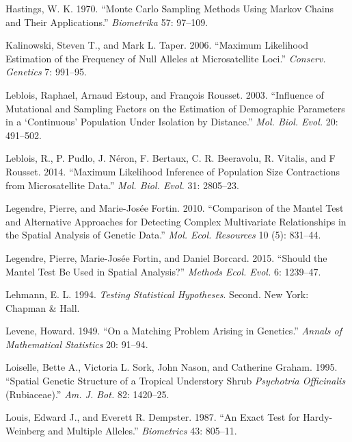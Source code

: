 \documentclass[
  12pt,
]{book}
\newlength{\cslhangindent}
\newlength{\cslentryspacingunit} %
\newenvironment{CSLReferences}[2] %
 {%
  \setlength{\parindent}{0pt}
  \ifodd #1
  \let\oldpar\par
  \def\par{\hangindent=\cslhangindent\oldpar}
  \fi
  \setlength{\parskip}{#2\cslentryspacingunit}
 }%
 {}
\begin{document}
\begin{CSLReferences}{1}{0}
\leavevmode{}%
Hastings, W. K. 1970. {``Monte {C}arlo Sampling Methods Using {M}arkov Chains and Their Applications.''} \emph{Biometrika} 57: 97--109.

\leavevmode{}%
Kalinowski, Steven T., and Mark L. Taper. 2006. {``Maximum Likelihood Estimation of the Frequency of Null Alleles at Microsatellite Loci.''} \emph{Conserv. Genetics} 7: 991--95.

\leavevmode{}%
Leblois, Raphael, Arnaud Estoup, and François Rousset. 2003. {``Influence of Mutational and Sampling Factors on the Estimation of Demographic Parameters in a {`Continuous'} Population Under Isolation by Distance.''} \emph{Mol. Biol. Evol.} 20: 491--502.

\leavevmode{}%
Leblois, R., P. Pudlo, J. Néron, F. Bertaux, C. R. Beeravolu, R. Vitalis, and F Rousset. 2014. {``Maximum Likelihood Inference of Population Size Contractions from Microsatellite Data.''} \emph{Mol. Biol. Evol.} 31: 2805--23.

\leavevmode{}%
Legendre, Pierre, and Marie-Josée Fortin. 2010. {``Comparison of the Mantel Test and Alternative Approaches for Detecting Complex Multivariate Relationships in the Spatial Analysis of Genetic Data.''} \emph{Mol. Ecol. Resources} 10 (5): 831--44.

\leavevmode{}%
Legendre, Pierre, Marie-Josée Fortin, and Daniel Borcard. 2015. {``Should the Mantel Test Be Used in Spatial Analysis?''} \emph{Methods Ecol. Evol.} 6: 1239--47.

\leavevmode{}%
Lehmann, E. L. 1994. \emph{Testing Statistical Hypotheses}. Second. New York: Chapman \& Hall.

\leavevmode{}%
Levene, Howard. 1949. {``On a Matching Problem Arising in Genetics.''} \emph{Annals of Mathematical Statistics} 20: 91--94.

\leavevmode{}%
Loiselle, Bette A., Victoria L. Sork, John Nason, and Catherine Graham. 1995. {``Spatial Genetic Structure of a Tropical Understory Shrub \emph{Psychotria Officinalis} (Rubiaceae).''} \emph{Am. J. Bot.} 82: 1420--25.

\leavevmode{}%
Louis, Edward J., and Everett R. Dempster. 1987. {``An Exact Test for Hardy-Weinberg and Multiple Alleles.''} \emph{Biometrics} 43: 805--11.


\end{CSLReferences}
\end{document}
